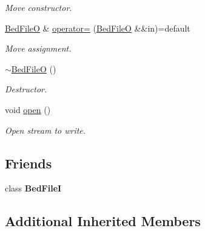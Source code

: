 \begin{DoxyCompactItemize}
\begin{DoxyCompactList}\small\item\em Move constructor. \end{DoxyCompactList}\item 
\mbox{\label{classsamp_files_1_1_bed_file_o_aede4f52d7769a1f6239d3b0a5d0fae40}} 
\hyperlink{classsamp_files_1_1_bed_file_o}{Bed\+FileO} \& \hyperlink{classsamp_files_1_1_bed_file_o_aede4f52d7769a1f6239d3b0a5d0fae40}{operator=} (\hyperlink{classsamp_files_1_1_bed_file_o}{Bed\+FileO} \&\&in)=default
\begin{DoxyCompactList}\small\item\em Move assignment. \end{DoxyCompactList}\item 
\mbox{\label{classsamp_files_1_1_bed_file_o_a6ed06cfab3d67901384f523fe7d3f734}} 
\hyperlink{classsamp_files_1_1_bed_file_o_a6ed06cfab3d67901384f523fe7d3f734}{$\sim$\+Bed\+FileO} ()
\begin{DoxyCompactList}\small\item\em Destructor. \end{DoxyCompactList}\item 
\mbox{\label{classsamp_files_1_1_bed_file_o_a70bee4622ebf338c6f17859f2409d17c}} 
void \hyperlink{classsamp_files_1_1_bed_file_o_a70bee4622ebf338c6f17859f2409d17c}{open} ()
\begin{DoxyCompactList}\small\item\em Open stream to write. \end{DoxyCompactList}\end{DoxyCompactItemize}
\subsection*{Friends}
\begin{DoxyCompactItemize}
\item 
\mbox{\label{classsamp_files_1_1_bed_file_o_a83903ab2cdc6179910bbb04232c007ea}} 
class {\bfseries Bed\+FileI}
\end{DoxyCompactItemize}
\subsection*{Additional Inherited Members}


